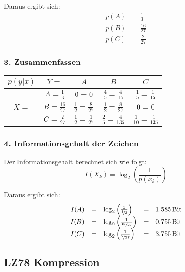 Daraus ergibt sich:
\begin{align*}
	p(A) &= \frac{1}{3} \\
	p(B) &= \frac{16}{27} \\
	p(C) &= \frac{2}{27}
\end{align*}


\subsubsection*{3. Zusammenfassen}

\begin{tabular}[H]{|c|c|c|c|c|}
	\hline
	$p(y|x)$ & $Y=$ & $A$ & $B$ & $C$ \\
	\hline
	\multirow{3}{*}{$X=$} & $A = \frac{1}{3}$ & $0 = 0$ & $\frac{4}{5} = \frac{4}{15}$ & $\frac{1}{5} = \frac{1}{15}$ \\
	\cline{2-5}
	& $B = \frac{16}{27}$ & $\frac{1}{2} = \frac{8}{27}$ & $\frac{1}{2} = \frac{8}{27}$ & $0 = 0$ \\
	\cline{2-5}
	& $C = \frac{2}{27}$ & $\frac{1}{2} = \frac{1}{27}$ & $\frac{2}{5} = \frac{4}{135}$ & $\frac{1}{10} = \frac{1}{135}$ \\
	\hline
\end{tabular}


\subsubsection*{4. Informationsgehalt der Zeichen}

Der Informationsgehalt berechnet sich wie folgt:
\[
	I(X_k) = \log_2\left(\frac{1}{p(x_k)}\right)
\]

Daraus ergibt sich:
{%
	\renewcommand{\arraystretch}{2}
	\begin{equation*}
		\begin{array}{rclcl}
			I(A) &=& \log_2\left(\frac{1}{\sfrac{1}{3}}\right) &=& 1.585 \, \textrm{Bit} \\
			I(B) &=& \log_2\left(\frac{1}{\sfrac{16}{27}}\right) &=& 0.755 \, \textrm{Bit} \\
			I(C) &=& \log_2\left(\frac{1}{\sfrac{2}{27}}\right) &=& 3.755 \, \textrm{Bit}
		\end{array}
	\end{equation*}
}%


\subsection{LZ78 Kompression}
\label{example:lz78}

